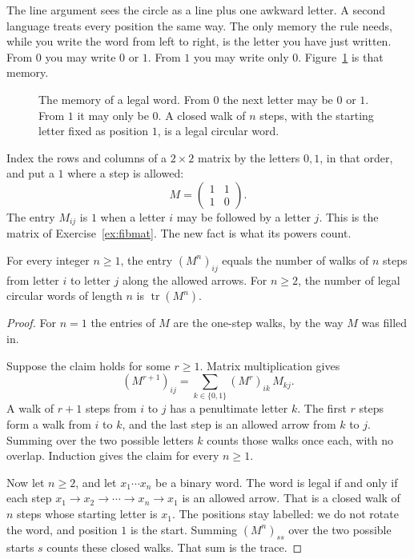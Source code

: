The line argument sees the circle as a line plus one awkward letter. A second language treats every position the same way. The only memory the rule needs, while you write the word from left to right, is the letter you have just written. From $0$ you may write $0$ or $1$. From $1$ you may write only $0$. Figure~\ref{fig:field-transitions} is that memory.

\begin{figure}[ht]
\centering
{}
\caption{The memory of a legal word. From $0$ the next letter may be $0$ or $1$. From $1$ it may only be $0$. A closed walk of $n$ steps, with the starting letter fixed as position $1$, is a legal circular word.}
\label{fig:field-transitions}
\end{figure}

Index the rows and columns of a $2\times2$ matrix by the letters $0,1$, in that order, and put a $1$ where a step is allowed:
\[
M=\begin{pmatrix}1&1\\1&0\end{pmatrix}.
\]
The entry $M_{ij}$ is $1$ when a letter $i$ may be followed by a letter $j$. This is the matrix of Exercise~\ref{ex:fibmat}. The new fact is what its powers count.

\begin{propositionx}
For every integer $n\ge1$, the entry $(M^n)_{ij}$ equals the number of walks of $n$ steps from letter $i$ to letter $j$ along the allowed arrows. For $n\ge2$, the number of legal circular words of length $n$ is $\operatorname{tr}(M^n)$.
\end{propositionx}

\begin{proof}
For $n=1$ the entries of $M$ are the one-step walks, by the way $M$ was filled in.

Suppose the claim holds for some $r\ge1$. Matrix multiplication gives
\[
(M^{r+1})_{ij}=\sum_{k\in\{0,1\}}(M^r)_{ik}\,M_{kj}.
\]
A walk of $r+1$ steps from $i$ to $j$ has a penultimate letter $k$. The first $r$ steps form a walk from $i$ to $k$, and the last step is an allowed arrow from $k$ to $j$. Summing over the two possible letters $k$ counts those walks once each, with no overlap. Induction gives the claim for every $n\ge1$.

Now let $n\ge2$, and let $x_1\cdots x_n$ be a binary word. The word is legal if and only if each step $x_1\to x_2\to\cdots\to x_n\to x_1$ is an allowed arrow. That is a closed walk of $n$ steps whose starting letter is $x_1$. The positions stay labelled: we do not rotate the word, and position $1$ is the start. Summing $(M^n)_{ss}$ over the two possible starts $s$ counts these closed walks. That sum is the trace.
\end{proof}

